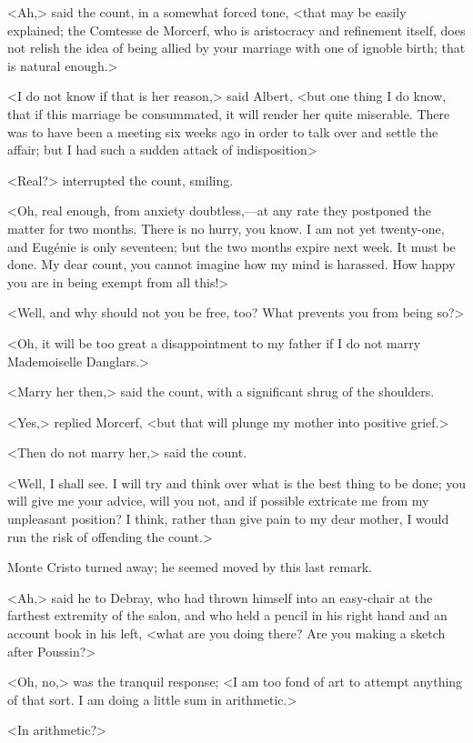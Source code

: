  <Ah,> said the count, in a somewhat forced tone, <that may be easily explained; the Comtesse de Morcerf, who is aristocracy and refinement itself, does not relish the idea of being allied by your marriage with one of ignoble birth; that is natural enough.> 

 <I do not know if that is her reason,> said Albert, <but one thing I do know, that if this marriage be consummated, it will render her quite miserable. There was to have been a meeting six weeks ago in order to talk over and settle the affair; but I had such a sudden attack of indisposition\longdash> 

 <Real?> interrupted the count, smiling. 

 <Oh, real enough, from anxiety doubtless,—at any rate they postponed the matter for two months. There is no hurry, you know. I am not yet twenty-one, and Eugénie is only seventeen; but the two months expire next week. It must be done. My dear count, you cannot imagine how my mind is harassed. How happy you are in being exempt from all this!> 

 <Well, and why should not you be free, too? What prevents you from being so?> 

 <Oh, it will be too great a disappointment to my father if I do not marry Mademoiselle Danglars.> 

 <Marry her then,> said the count, with a significant shrug of the shoulders. 

 <Yes,> replied Morcerf, <but that will plunge my mother into positive grief.> 

 <Then do not marry her,> said the count. 

 <Well, I shall see. I will try and think over what is the best thing to be done; you will give me your advice, will you not, and if possible extricate me from my unpleasant position? I think, rather than give pain to my dear mother, I would run the risk of offending the count.> 

 Monte Cristo turned away; he seemed moved by this last remark. 

 <Ah,> said he to Debray, who had thrown himself into an easy-chair at the farthest extremity of the salon, and who held a pencil in his right hand and an account book in his left, <what are you doing there? Are you making a sketch after Poussin?> 

 <Oh, no,> was the tranquil response; <I am too fond of art to attempt anything of that sort. I am doing a little sum in arithmetic.> 

 <In arithmetic?> 

